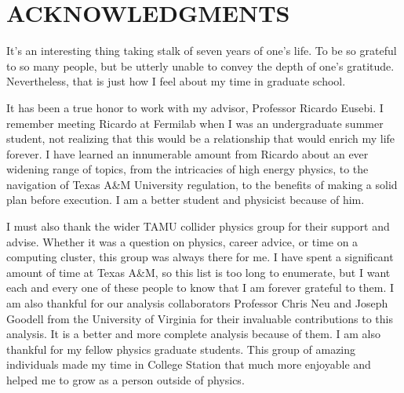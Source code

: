 %
%
%


\chapter*{ACKNOWLEDGMENTS}


\indent It's an interesting thing taking stalk of seven years of one's life. To be so grateful to so many people, but be utterly unable to convey the depth of one's gratitude. Nevertheless, that is just how I feel about my time in graduate school.

It has been a true honor to work with my advisor, Professor Ricardo Eusebi. I remember meeting Ricardo at Fermilab when I was an undergraduate summer student, not realizing that this would be a relationship that would enrich my life forever. I have learned an innumerable amount from Ricardo about an ever widening range of topics, from the intricacies of high energy physics, to the navigation of Texas A\&M University regulation, to the benefits of making a solid plan before execution. I am a better student and physicist because of him.

I must also thank the wider TAMU collider physics group for their support and advise. Whether it was a question on physics, career advice, or time on a computing cluster, this group was always there for me. I have spent a significant amount of time at Texas A\&M, so this list is too long to enumerate, but I want each and every one of these people to know that I am forever grateful to them. I am also thankful for our analysis collaborators Professor Chris Neu and Joseph Goodell from the University of Virginia for their invaluable contributions to this analysis. It is a better and more complete analysis because of them. I am also thankful for my fellow physics graduate students. This group of amazing individuals made my time in College Station that much more enjoyable and helped me to grow as a person outside of physics.


